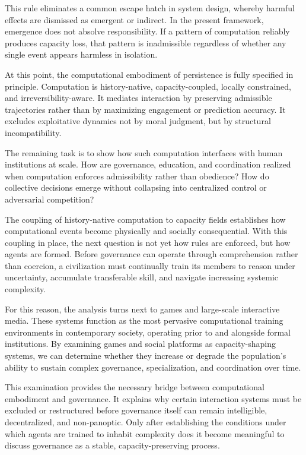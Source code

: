 \documentclass[12pt,oneside]{book}
\begin{document}
This rule eliminates a common escape hatch in system design, whereby harmful effects are dismissed as emergent or indirect. In the present framework, emergence does not absolve responsibility. If a pattern of computation reliably produces capacity loss, that pattern is inadmissible regardless of whether any single event appears harmless in isolation.

At this point, the computational embodiment of persistence is fully specified in principle. Computation is history-native, capacity-coupled, locally constrained, and irreversibility-aware. It mediates interaction by preserving admissible trajectories rather than by maximizing engagement or prediction accuracy. It excludes exploitative dynamics not by moral judgment, but by structural incompatibility.

The remaining task is to show how such computation interfaces with human institutions at scale. How are governance, education, and coordination realized when computation enforces admissibility rather than obedience? How do collective decisions emerge without collapsing into centralized control or adversarial competition?

The coupling of history-native computation to capacity fields establishes how computational events become physically and socially consequential. With this coupling in place, the next question is not yet how rules are enforced, but how agents are formed. Before governance can operate through comprehension rather than coercion, a civilization must continually train its members to reason under uncertainty, accumulate transferable skill, and navigate increasing systemic complexity.

For this reason, the analysis turns next to games and large-scale interactive media. These systems function as the most pervasive computational training environments in contemporary society, operating prior to and alongside formal institutions. By examining games and social platforms as capacity-shaping systems, we can determine whether they increase or degrade the population’s ability to sustain complex governance, specialization, and coordination over time.

This examination provides the necessary bridge between computational embodiment and governance. It explains why certain interaction systems must be excluded or restructured before governance itself can remain intelligible, decentralized, and non-panoptic. Only after establishing the conditions under which agents are trained to inhabit complexity does it become meaningful to discuss governance as a stable, capacity-preserving process.
\end{document}
